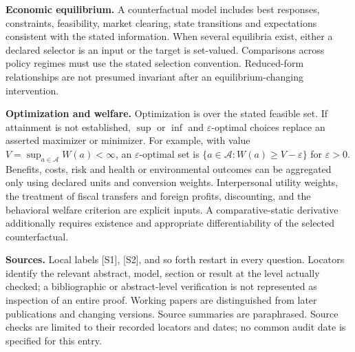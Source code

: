 \documentclass[11pt,a4paper]{article}
\begin{document}
\textbf{Economic equilibrium.} A counterfactual model includes best responses, constraints, feasibility, market clearing, state transitions and expectations consistent with the stated information. When several equilibria exist, either a declared selector is an input or the target is set-valued. Comparisons across policy regimes must use the stated selection convention. Reduced-form relationships are not presumed invariant after an equilibrium-changing intervention.

\textbf{Optimization and welfare.} Optimization is over the stated feasible set. If attainment is not established, $\sup$ or $\inf$ and $\varepsilon$-optimal choices replace an asserted maximizer or minimizer. For example, with value $V=\sup_{a\in\mathcal A}W(a)<\infty$, an $\varepsilon$-optimal set is $\{a\in\mathcal A:W(a)\geq V-\varepsilon\}$ for $\varepsilon>0$. Benefits, costs, risk and health or environmental outcomes can be aggregated only using declared units and conversion weights. Interpersonal utility weights, the treatment of fiscal transfers and foreign profits, discounting, and the behavioral welfare criterion are explicit inputs. A comparative-static derivative additionally requires existence and appropriate differentiability of the selected counterfactual.

\textbf{Sources.} Local labels [S1], [S2], and so forth restart in every question. Locators identify the relevant abstract, model, section or result at the level actually checked; a bibliographic or abstract-level verification is not represented as inspection of an entire proof. Working papers are distinguished from later publications and changing versions. Source summaries are paraphrased. Source checks are limited to their recorded locators and dates; no common audit date is specified for this entry.
\end{document}
